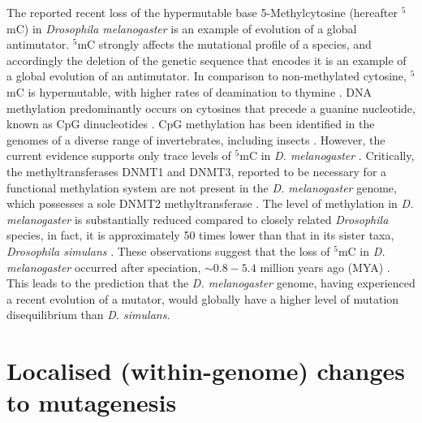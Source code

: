 The reported recent loss of the hypermutable base 5-Methylcytosine (hereafter $^5$mC) in \textit{Drosophila melanogaster} is an example of evolution of a global antimutator. 
$^5$mC strongly affects the mutational profile of a species, and accordingly the deletion of the genetic sequence that encodes it is an example of a global evolution of an antimutator. In comparison to non-methylated cytosine, $^5$mC is hypermutable, with higher rates of deamination to thymine \citep{Shen1994TheDNA, Coulondre1978MolecularColi}. DNA methylation predominantly occurs on cytosines that precede a guanine nucleotide, known as CpG dinucleotides \citep{Holliday1975DNADevelopment}. CpG methylation has been identified in the genomes of a diverse range of invertebrates, including insects \citep{Wang2010EstimatingLoci}. However, the current evidence supports only trace levels of $^5$mC in \textit{D. melanogaster} \citep{Capuano2014CytosineSpecies, Deshmukh2018LevelsGenome}. Critically, the methyltransferases DNMT1 and DNMT3, reported to be necessary for a functional methylation system are not present in the \textit{D. melanogaster} genome, which possesses a sole DNMT2 methyltransferase \citep{Goll2005EukaryoticMethyltransferases, Tweedie1999VestigesMelanogaster}. The level of methylation in \textit{D. melanogaster} is substantially reduced compared to closely related \textit{Drosophila} species, in fact, it is approximately 50 times lower than that in its sister taxa, \textit{Drosophila simulans} \citep{Deshmukh2018LevelsGenome}. These observations suggest that the loss of $^5$mC in \textit{D. melanogaster} occurred after speciation, $\sim 0.8-5.4$ million years ago (MYA) \citep{Cutter2008DivergenceRate, Wang2010EstimatingLoci, Tamura2004TemporalClocks}. This leads to the prediction that the \textit{D. melanogaster} genome, having experienced a recent evolution of a mutator, would globally have a higher level of mutation disequilibrium than \textit{D. simulans}. 

\section{Localised (within-genome) changes to mutagenesis}


